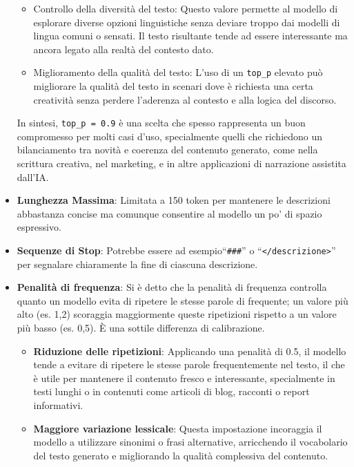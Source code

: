 \begin{itemize}
\begin{itemize}
                \item Controllo della diversità del testo: Questo valore permette al modello di esplorare diverse opzioni linguistiche senza deviare troppo dai modelli di lingua comuni o sensati. Il testo risultante tende ad essere interessante ma ancora legato alla realtà del contesto dato.
                \item Miglioramento della qualità del testo: L'uso di un \texttt{top\_p} elevato può migliorare la qualità del testo in scenari dove è richiesta una certa creatività senza perdere l'aderenza al contesto e alla logica del discorso.
            \end{itemize}
        
            In sintesi, \texttt{top\_p = 0.9} è una scelta che spesso rappresenta un buon compromesso per molti casi d'uso, specialmente quelli che richiedono un bilanciamento tra novità e coerenza del contenuto generato, come nella scrittura creativa, nel marketing, e in altre applicazioni di narrazione assistita dall'IA.
        
        \item
            \textbf{Lunghezza Massima}: Limitata a 150 token per mantenere le descrizioni abbastanza concise ma comunque consentire al modello un po’ di spazio espressivo.
        
        \item
            \textbf{Sequenze di Stop}: Potrebbe essere ad esempio``\texttt{\#\#\#}'' o ``\texttt{</descrizione>}'' per segnalare chiaramente la fine di ciascuna descrizione.
        
        \item
            \textbf{Penalità di frequenza}: Si è detto che la penalità di frequenza controlla quanto un modello evita di ripetere le stesse parole di frequente; un valore più alto (es. 1,2) scoraggia maggiormente queste ripetizioni rispetto a un valore più basso (es. 0,5). È una sottile differenza di calibrazione.
            \begin{itemize}
                \item \textbf{Riduzione delle ripetizioni}: Applicando una penalità di 0.5, il modello tende a evitare di ripetere le stesse parole frequentemente nel testo, il che è utile per mantenere il contenuto fresco e interessante, specialmente in testi lunghi o in contenuti come articoli di blog, racconti o report informativi.
                
                \item \textbf{Maggiore variazione lessicale}: Questa impostazione incoraggia il modello a utilizzare sinonimi o frasi alternative, arricchendo il vocabolario del testo generato e migliorando la qualità complessiva del contenuto.
                

\end{itemize}
\end{itemize}
